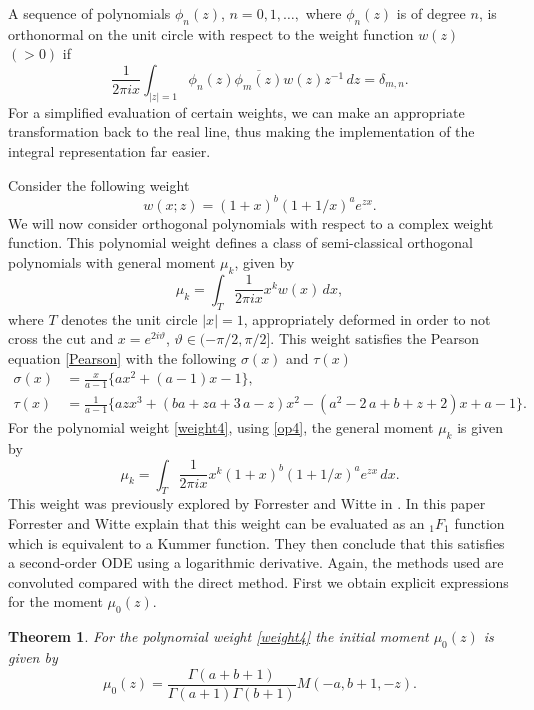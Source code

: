 \documentclass[12pt]{article}
\newtheorem{mydef}{Theorem}[section]
\numberwithin{figure}{section}
\numberwithin{equation}{section}
\numberwithin{table}{section}
\begin{document}
A sequence of polynomials ${\phi_n(z)}$, $n=0,1,\hdots,$ where $\phi_n(z)$ is of degree $n$, is orthonormal on the unit circle with respect to the weight function $w(z)$ $(>0)$ if \cite[\S18.33]{DLMF}
$$\frac{1}{2\pi i x}\int_{|z|=1}\phi_n(z)\overline{\phi_m(z)}w(z)z^{-1}\,dz=\delta_{m,n}.$$
For a simplified evaluation of certain weights, we can make an appropriate transformation back to the real line, thus making the implementation of the integral representation far easier.

Consider the following weight
\begin{equation}
w(x;z)=(1+x)^ b(1+1/x)^ a e^{zx}.\label{weight4}
\end{equation}
We will now consider orthogonal polynomials with respect to a complex weight function.
This  polynomial weight defines a class of semi-classical orthogonal polynomials with general moment $\mu_k$, given by
\begin{equation}
\mu_k=\int_{T}\frac{1}{2\pi i x}x^kw(x)\,dx,\label{op4}
\end{equation}
where $T$ denotes the unit circle $|x| = 1$, appropriately deformed in order to not cross the cut
and $x=e^{2i\vartheta}$, $\vartheta \in (-\pi/2, \pi/2]$.
This weight satisfies the Pearson equation \eqref{Pearson} with the following $\sigma(x)$ and $\tau(x)$
\begin{align*}
\sigma(x)&=\frac{x}{a-1}\bigg\{{{a{x}^{2}}}+(a-1){x}-{ {1}}\bigg\},\\
\tau(x)&=\frac{1}{a-1}\bigg\{{ {az{x}^{3}}}+{ { ( ba+za+3\,a-z ) {x}^{2
}}}-{{ ( {a}^{2}-2\,a+b+z+2 ) x}}+a-1\bigg\}.
\end{align*}
For the  polynomial weight \eqref{weight4}, using \eqref{op4}, the  general moment $\mu_k$ is given by
\begin{equation}\nonumber
\mu_k=\int_{T}\frac{1}{2\pi i x}x^k(1+x)^ b(1+1/x)^ a e^{zx}\,dx.
\end{equation}
This weight was previously explored by Forrester and Witte in \cite{2004:159,Witte}. In this paper Forrester and Witte explain that this weight can be evaluated as an $_1F_1$ function which is equivalent to a Kummer function. They then conclude that this satisfies a second-order ODE using a logarithmic derivative. Again, the methods used are convoluted compared with the direct method.
First we obtain explicit expressions for the moment $\mu_0(z)$.
\begin{mydef}
For the  polynomial weight \eqref{weight4} the initial moment $\mu_0(z)$ is given by
\begin{equation}\nonumber
\mu_0(z)=\frac{\Gamma( a+ b+1)}{\Gamma( a+1)\Gamma( b+1)} M(- a, b+1,-z).
\end{equation}
\end{mydef}
\end{document}
